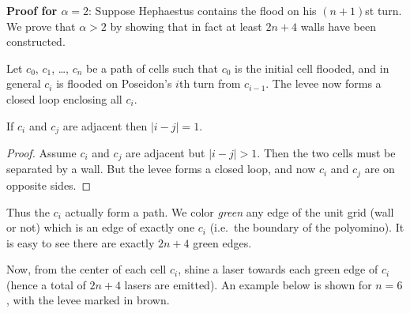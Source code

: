 \bigskip

\textbf{Proof for $\alpha = 2$}:
Suppose Hephaestus contains the flood
on his $(n+1)$st turn.
We prove that $\alpha > 2$ by showing
that in fact at least $2n+4$ walls have been constructed.

Let $c_0$, $c_1$, \dots, $c_n$ be a path of cells such that
$c_0$ is the initial cell flooded,
and in general $c_i$ is flooded on
Poseidon's $i$th turn from $c_{i-1}$.
The levee now forms a closed loop enclosing all $c_i$.

\begin{claim*}
  If $c_i$ and $c_j$ are adjacent
  then $|i-j|=1$.
\end{claim*}
\begin{proof}
  Assume $c_i$ and $c_j$ are adjacent but $|i-j|>1$.
  Then the two cells must be separated by a wall.
  But the levee forms a closed loop,
  and now $c_i$ and $c_j$ are on opposite sides.
\end{proof}

Thus the $c_i$ actually form a path.
We color \emph{green} any edge of the unit grid (wall or not)
which is an edge of exactly one $c_i$
(i.e.\ the boundary of the polyomino).
It is easy to see there are exactly $2n+4$ green edges.

Now, from the center of each cell $c_i$,
shine a laser towards each green edge of $c_i$
(hence a total of $2n+4$ lasers are emitted).
An example below is shown for $n = 6$,
with the levee marked in brown.

